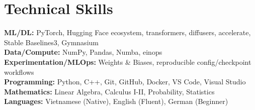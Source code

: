 \documentclass[letterpaper,11pt]{article}
\begin{document}
\section{Technical Skills}
\begin{itemize}[leftmargin=0.15in, label={}]
  \small{\item{
    \textbf{ML/DL:} PyTorch, Hugging Face ecosystem, transformers, diffusers, accelerate, Stable Baselines3, Gymnasium \\
    \textbf{Data/Compute:} NumPy, Pandas, Numba, einops \\
    \textbf{Experimentation/MLOps:} Weights \& Biases, reproducible config/checkpoint workflows \\
    \textbf{Programming:} Python, C++, Git, GitHub, Docker, VS Code, Visual Studio \\
    \textbf{Mathematics:} Linear Algebra, Calculus I-II, Probability, Statistics \\
    \textbf{Languages:} Vietnamese (Native), English (Fluent), German (Beginner)
  }}
\end{itemize}

\end{document}
